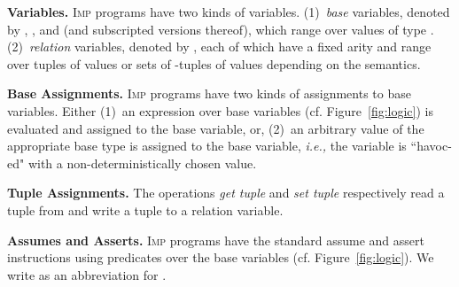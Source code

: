 \documentclass[nocopyrightspace]{sigplanconf}
\def\mypara#1{\smallskip\noindent\textbf{#1}}
\newcommand{\ie}{\textit{i.e.,}\xspace}
\newcommand{\ilang}{\textsc{Imp}\xspace}
\def\REFREL{relation\xspace}
\begin{document}
\mypara{Variables.} \ilang programs have two kinds of variables. 
(1)~\emph{base} variables, denoted by 
, ,  and  (and subscripted versions thereof), 
which range over values of type .
(2)~\emph{\REFREL} variables, denoted by ,
each of which have a fixed arity  and range over tuples of values
or sets of -tuples of values depending on the semantics.

\mypara{Base Assignments.}
\ilang programs have two kinds of assignments to base variables. 
Either
(1)~an expression over base variables (cf. Figure~\ref{fig:logic}) 
is evaluated and assigned to the base variable, or,
(2)~an arbitrary value of the appropriate base type is assigned to the base
variable, \ie the variable is ``havoc-ed" with a non-deterministically
chosen value.


\mypara{Tuple Assignments.}
The operations \emph{get tuple} and \emph{set tuple} 
respectively read a tuple from and write a tuple to a \REFREL 
variable.

\mypara{Assumes and Asserts.}
\ilang programs have the standard assume and assert instructions using 
predicates over the base variables (cf. Figure~\ref{fig:logic}).
We write  as an abbreviation for .
\end{document}

